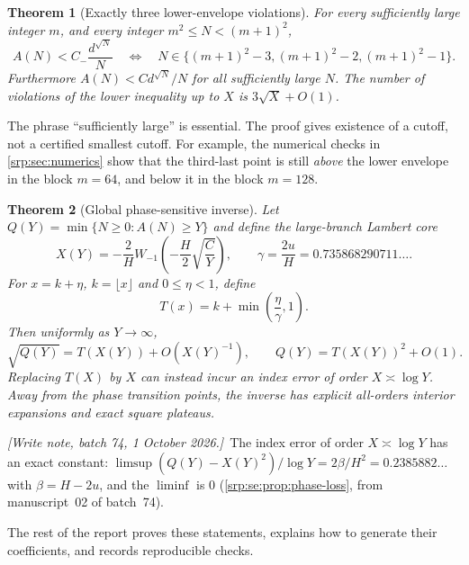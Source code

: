 \documentclass[11pt,a4paper]{article}
\numberwithin{equation}{section}
\newtheorem{theorem}{Theorem}[section]
\theoremstyle{definition}
\theoremstyle{remark}
\newcommand{\writenotefour}[1]{\par\smallskip\noindent
 \textit{[Write note, batch 74, 1 October 2026.]}\ #1\par\smallskip}
\begin{document}
\begin{theorem}[Exactly three lower-envelope violations]
\label{srp:thm:three}
For every sufficiently large integer $m$, and every integer
$m^2\le N<(m+1)^2$,
\begin{equation}
 A(N)<C_-\frac{d^{\sqrt N}}{N}
 \quad\Longleftrightarrow\quad
 N\in\{(m+1)^2-3,(m+1)^2-2,(m+1)^2-1\}.
 \label{srp:eq:three}
\end{equation}
Furthermore $A(N)<C d^{\sqrt N}/N$ for all sufficiently large $N$.
The number of violations of the lower inequality up to $X$ is
$3\sqrt X+O(1)$.
\end{theorem}

The phrase ``sufficiently large'' is essential. The proof gives existence
of a cutoff, not a certified smallest cutoff. For example, the numerical
checks in \cref{srp:sec:numerics} show that the third-last point is still
\emph{above} the lower envelope in the block $m=64$, and below it in the
block $m=128$.

\begin{theorem}[Global phase-sensitive inverse]
\label{srp:thm:main-inverse}
Let $Q(Y)=\min\{N\ge0:A(N)\ge Y\}$ and define the large-branch Lambert core
\begin{equation}
 X(Y)=-\frac2H W_{-1}\left(-\frac H2\sqrt{\frac CY}\right),
 \qquad \gamma=\frac{2u}{H}=0.735868290711\ldots.
 \label{srp:eq:core}
\end{equation}
For $x=k+\eta$, $k=\lfloor x\rfloor$ and $0\le\eta<1$, define
\begin{equation}
 T(x)=k+\min\left(\frac\eta\gamma,1\right).
 \label{srp:eq:T}
\end{equation}
Then uniformly as $Y\to\infty$,
\begin{equation}
 \sqrt{Q(Y)}=T(X(Y))+O(X(Y)^{-1}),\qquad
 Q(Y)=T(X(Y))^2+O(1).
 \label{srp:eq:global-inverse}
\end{equation}
Replacing $T(X)$ by $X$ can instead incur an index error of order
$X\asymp\log Y$. Away from the phase transition points, the inverse has
explicit all-orders interior expansions and exact square plateaus.
\end{theorem}

\writenotefour{The index error of order $X\asymp\log Y$ has an exact
constant: $\limsup(Q(Y)-X(Y)^2)/\log Y=2\beta/H^2=0.2385882\ldots$ with
$\beta=H-2u$, and the $\liminf$ is $0$
(\cref{srp:se:prop:phase-loss}, from manuscript~02 of batch~74).}

The rest of the report proves these statements, explains how to generate
their coefficients, and records reproducible checks.
\end{document}
